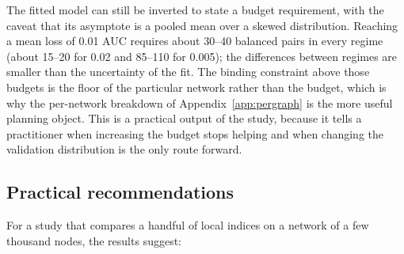 \documentclass{comjnl}
\begin{document}
The fitted model can still be inverted to state a budget requirement, with the caveat that its asymptote is a pooled mean over a skewed distribution. Reaching a mean loss of 0.01 AUC requires about 30--40 balanced pairs in every regime (about 15--20 for 0.02 and 85--110 for 0.005); the differences between regimes are smaller than the uncertainty of the fit. The binding constraint above those budgets is the floor of the particular network rather than the budget, which is why the per-network breakdown of Appendix~\ref{app:pergraph} is the more useful planning object. This is a practical output of the study, because it tells a practitioner when increasing the budget stops helping and when changing the validation distribution is the only route forward.

\subsection{Practical recommendations}

For a study that compares a handful of local indices on a network of a few thousand nodes, the results suggest:
\end{document}
